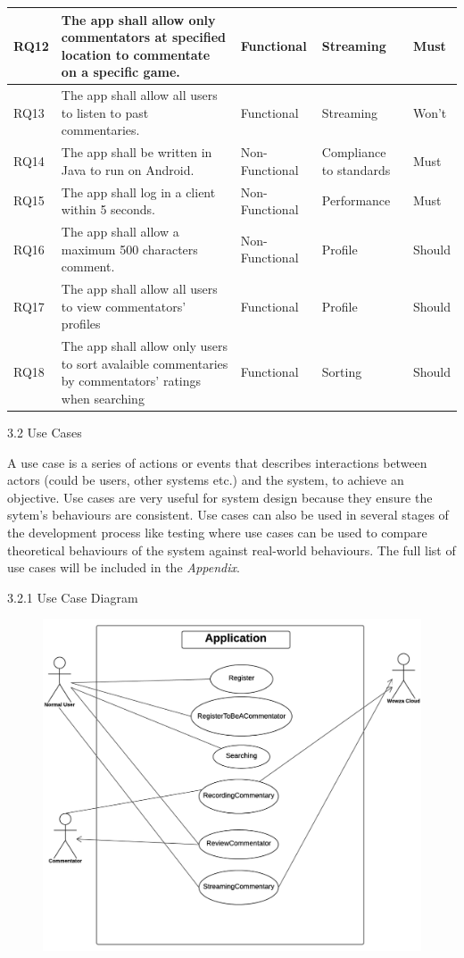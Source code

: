 \documentclass{article}
\begin{document}
\begin{flushleft}
\begin{longtable}[t]{| p{1cm} | p{6cm} | p{1.8cm} | p{2cm} | p{1.2cm} |}
\hline
RQ12 & The app shall allow only commentators at specified location to commentate on a specific game. & Functional & Streaming & Must\\
\hline
RQ13 & The app shall allow all users to listen to past commentaries. & Functional & Streaming & Won't\\
\hline
RQ14 & The app shall be written in Java to run on Android. & Non-Functional & Compliance to standards & Must\\
\hline
RQ15 & The app shall log in a client within 5 seconds. & Non-Functional & Performance & Must\\
\hline
RQ16 & The app shall allow a maximum 500 characters comment. & Non-Functional & Profile & Should\\
\hline
RQ17 & The app shall allow all users to view commentators' profiles & Functional & Profile & Should\\
\hline
RQ18 & The app shall allow only users to sort avalaible commentaries by commentators' ratings when searching & Functional & Sorting & Should\\
\hline
\end{longtable}
{\Large 3.2 Use Cases}\par
A use case is a series of actions or events that describes interactions between actors (could be users, other systems etc.) and the system, to achieve an objective. Use cases are very useful for system design because they ensure the sytem's behaviours are consistent. Use cases can also be used in several stages of the development process like testing where use cases can be used to compare theoretical behaviours of the system against real-world behaviours. The full list of use cases will be included in the \textit{Appendix}.\par
{\large 3.2.1 Use Case Diagram}\par
\begin{figure}[H]
    \centering
    \includegraphics[width=14cm]{use-case-diagram}

\end{figure}
\end{flushleft}
\end{document}
